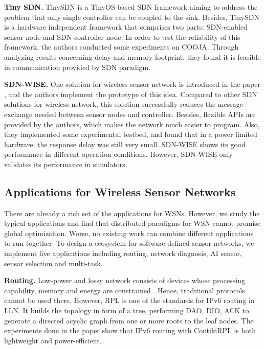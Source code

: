 \textbf{Tiny SDN.}
TinySDN \cite{de2015tinysdn} is a TinyOS-based SDN framework aiming to 
address the problem that only single controller can be coupled to the sink. 
Besides, TinySDN is a hardware independent framework that comprises two parts: 
SDN-enabled sensor node and SDN-controller node. 
In order to test the reliability of this framework, the authors conducted some experiments on COOJA. 
Through analyzing results concerning delay and memory 
footprint, they found it is feasible in communication provided by SDN paradigm.

\textbf{SDN-WISE.}
One solution for wireless sensor network is introduced in the paper \cite{galluccio2015sdn}, 
and the authors implement the prototype of this idea. Compared to other SDN solutions for wireless network, 
this solution successfully reduces the message exchange needed between sensor nodes and controller. 
Besides, flexible APIs are provided by the authors, which makes the network much easier to program. 
Also, they implemented some experimental testbed, and found that in a power limited hardware, the response delay was still very small. 
SDN-WISE shows its good performance in different operation conditions. However, SDN-WISE only validates its performance in simulators. 


\subsection{Applications for Wireless Sensor Networks}


There are already a rich set of the applications for WSNs. 
However, we study the typical applications and find that
distributed paradigms for WSN cannot 
promise global optimization. %
Worse, no existing work can combine different applications to run together.
To design a ecosystem for software defined sensor networks, we implement five applications including
routing, network diagnosis, AI sensor, sensor selection and multi-task.




\textbf{Routing.}
Low-power and lossy network consists of devices whose processing capability, 
memory and energy are constrained \cite{Winter2012}. Hence, traditional 
protocols cannot be used there. However, RPL is one of the standards for IPv6\cite{Deering1998Internet} routing in LLN. 
It builds the topology in form of a tree, performing DAO, DIO, ACK to generate a directed acyclic graph 
from one or more roots to the leaf nodes. The experiments done in the paper \cite{Tsiftes2010a} show 
that IPv6 routing with ContikiRPL is both lightweight and power-efficient.
 
